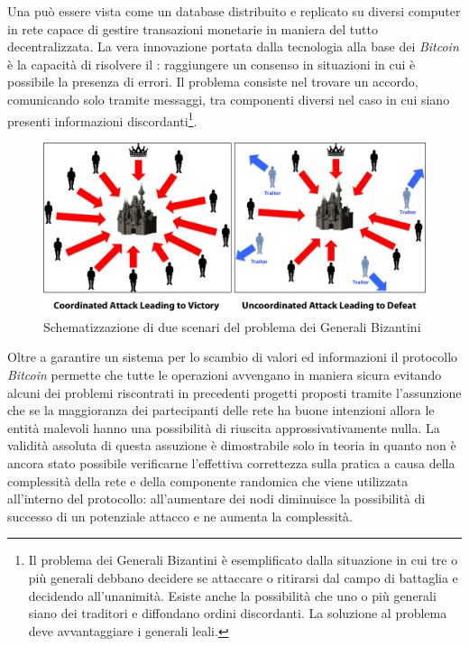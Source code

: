 Una  può essere vista come un database distribuito e replicato su diversi computer in rete capace di gestire transazioni monetarie in maniera del tutto decentralizzata.\newline\newline
La vera innovazione portata dalla tecnologia alla base dei \textit{Bitcoin} è la capacità di risolvere il : raggiungere un consenso in situazioni in cui è possibile la presenza di errori.\newline
Il problema consiste nel trovare un accordo, comunicando solo tramite messaggi, tra componenti diversi nel caso in cui siano presenti informazioni discordanti\footnote{Il problema dei Generali Bizantini è esemplificato dalla situazione in cui tre o più generali debbano decidere se attaccare o ritirarsi dal campo di battaglia e decidendo all'unanimità. Esiste anche la possibilità che uno o più generali siano dei traditori e diffondano ordini discordanti. La soluzione al problema deve avvantaggiare i generali leali.}.\newline
\begin{figure}
    \centering
    \includegraphics[scale=0.2]{images/byzantine.png}
    \caption{Schematizzazione di due scenari del problema dei Generali Bizantini}
\end{figure}
Oltre a garantire un sistema per lo scambio di valori ed informazioni il protocollo \textit{Bitcoin} permette che tutte le operazioni avvengano in maniera sicura evitando alcuni dei problemi riscontrati in precedenti progetti proposti tramite l'assunzione che se la maggioranza dei partecipanti delle rete ha buone intenzioni allora le entità malevoli hanno una possibilità di riuscita approssivativamente nulla.\newline
La validità assoluta di questa assuzione è dimostrabile solo in teoria in quanto non è ancora stato possibile verificarne l'effettiva correttezza sulla pratica a causa della complessità della rete e della componente randomica che viene utilizzata all'interno del protocollo: all'aumentare dei nodi diminuisce la possibilità di successo di un potenziale attacco e ne aumenta la complessità.\newline
